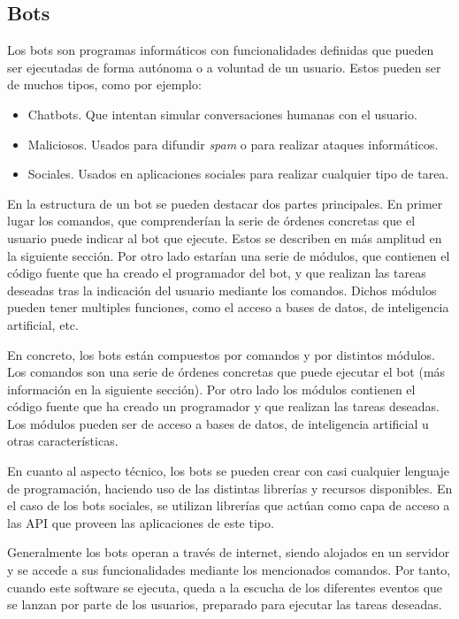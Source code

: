 \subsection{Bots}

Los bots son programas informáticos con funcionalidades definidas que pueden ser ejecutadas de forma autónoma o a voluntad de un usuario. Estos pueden ser de muchos tipos, como por ejemplo:

\begin{itemize}
	\item Chatbots. Que intentan simular conversaciones humanas con el usuario.
	\item Maliciosos. Usados para difundir \textit{spam} o para realizar ataques informáticos.
	\item Sociales. Usados en aplicaciones sociales para realizar cualquier tipo de tarea.
\end{itemize}

En la estructura de un bot se pueden destacar dos partes principales. En primer lugar los comandos, que comprenderían la serie de órdenes concretas que el usuario puede indicar al bot que ejecute. Estos se describen en más amplitud en la siguiente sección. Por otro lado estarían una serie de módulos, que contienen el código fuente que ha creado el programador del bot, y que realizan las tareas deseadas tras la indicación del usuario mediante los comandos. Dichos módulos pueden tener multiples funciones, como el acceso a bases de datos, de inteligencia artificial, etc.

En concreto, los bots están compuestos por comandos y por distintos módulos. Los comandos son una serie de órdenes concretas que puede ejecutar el bot (más información en la siguiente sección). Por otro lado los módulos contienen el código fuente que ha creado un programador y que realizan las tareas deseadas. Los módulos pueden ser de acceso a bases de datos, de inteligencia artificial u otras características.

En cuanto al aspecto técnico, los bots se pueden crear con casi cualquier lenguaje de programación, haciendo uso de las distintas librerías y recursos disponibles. En el caso de los bots sociales, se utilizan librerías que actúan como capa de acceso a las API que proveen las aplicaciones de este tipo.

Generalmente los bots operan a través de internet, siendo alojados en un servidor y se accede a sus funcionalidades mediante los mencionados comandos. Por tanto, cuando este software se ejecuta, queda a la escucha de los diferentes eventos que se lanzan por parte de los usuarios, preparado para ejecutar las tareas deseadas.

